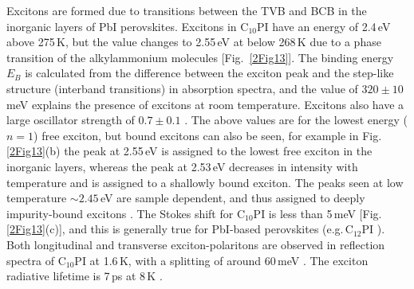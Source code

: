 Excitons are formed due to transitions between the TVB and BCB in the inorganic layers of PbI perovskites. Excitons in $\textrm{C}_{10}$PI have an energy of 2.4\,eV above 275\,K, but the value changes to 2.55\,eV at below 268\,K due to a phase transition of the alkylammonium molecules [Fig.\ \ref{2Fig13}]. The binding energy $E_B$ is calculated from the difference between the exciton peak and the step-like structure (interband transitions) in absorption spectra, and the value of $320\pm10$\,meV explains the presence of excitons at room temperature. Excitons also have a large oscillator strength of $0.7\pm0.1$ \cite{Ishihara1990}. The above values are for the lowest energy ($n=1$) free exciton, but bound excitons can also be seen, for example in Fig.\,\ref{2Fig13}(b) the peak at 2.55\,eV is assigned to the lowest free exciton in the inorganic layers, whereas the peak at 2.53\,eV decreases in intensity with temperature and is assigned to a shallowly bound exciton. The peaks seen at low temperature $\sim2.45$\,eV are sample dependent, and thus assigned to deeply impurity-bound excitons \cite{Ishihara1990}. The Stokes shift for $\textrm{C}_{10}$PI is less than 5\,meV [Fig.\,\ref{2Fig13}(c)], and this is generally true for PbI-based perovskites (e.g.\,$\textrm{C}_{12}$PI \cite{Pradeesh2009}). Both longitudinal and transverse exciton-polaritons are observed in reflection spectra of $\textrm{C}_{10}$PI at 1.6\,K, with a splitting of around 60\,meV \cite{Ishihara1990, Ishihara1989}. The exciton radiative lifetime is 7\,ps at 8\,K \cite{Kondo1998a}.

